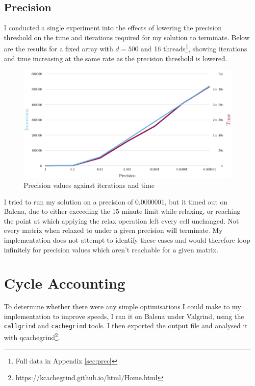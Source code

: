 \documentclass[12pt]{article}
\begin{document}
\subsection{Precision}

I conducted a single experiment into the effects of lowering the precision threshold on the time and iterations required for my solution to terminate. Below are the results for a fixed array with $d=500$ and 16 threads\footnote{Full data in Appendix \ref{sec:prec}}, showing iterations and time increasing at the same rate as the precision threshold is lowered.

\begin{figure}[h!]
	\hspace{-0.8cm}\includegraphics[width=1.1\textwidth]{img/prec-time.pdf}
	\caption{Precision values against iterations and time}
	\label{fig:precision}
\end{figure}
I tried to run my solution on a precision of 0.0000001, but it timed out on Balena, due to either exceeding the 15 minute limit while relaxing, or reaching the point at which applying the relax operation left every cell unchanged. Not every matrix when relaxed to under a given precision will terminate. My implementation does not attempt to identify these cases and would therefore loop infinitely for precision values which aren't reachable for a given matrix.

\section{Cycle Accounting}

To determine whether there were any simple optimisations I could make to my implementation to improve speeds, I ran it on Balena under Valgrind, using the \texttt{callgrind} and \texttt{cachegrind} tools. I then exported the output file and analysed it with qcachegrind\footnote{https://kcachegrind.github.io/html/Home.html}.
\end{document}
